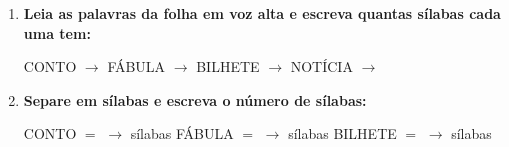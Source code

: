 \begin{exercicio}
\begin{enumerate}[resume]
  \item \textbf{Leia as palavras da folha em voz alta e escreva quantas sílabas cada uma tem:}

  \begin{center}
  CONTO $\rightarrow$ \underline{\hspace{1cm}} \quad FÁBULA $\rightarrow$ \underline{\hspace{1cm}} \quad BILHETE $\rightarrow$ \underline{\hspace{1cm}} \quad NOTÍCIA $\rightarrow$ \underline{\hspace{1cm}}
  \end{center}

  \item \textbf{Separe em sílabas e escreva o número de sílabas:}
  \begin{center}
  CONTO $=$ \underline{\hspace{1.2cm}} $\rightarrow$ \underline{\hspace{0.8cm}} sílabas \quad FÁBULA $=$ \underline{\hspace{1.2cm}} $\rightarrow$ \underline{\hspace{0.8cm}} sílabas \quad BILHETE $=$ \underline{\hspace{1.2cm}} $\rightarrow$ \underline{\hspace{0.8cm}} sílabas
  \end{center}

\end{enumerate}

\end{exercicio}



